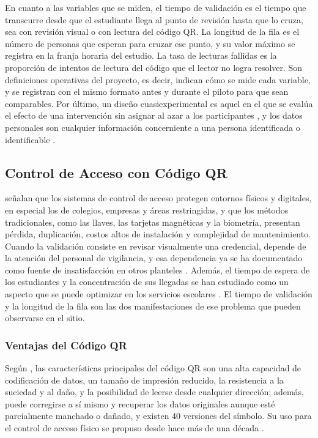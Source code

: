 En cuanto a las variables que se miden, el tiempo de validación es el tiempo
que transcurre desde que el estudiante llega al punto de revisión hasta que lo
cruza, sea con revisión visual o con lectura del código QR. La longitud de la
fila es el número de personas que esperan para cruzar ese punto, y su valor
máximo se registra en la franja horaria del estudio. La tasa de lecturas
fallidas es la proporción de intentos de lectura del código que el lector no
logra resolver. Son definiciones operativas del proyecto, es decir, indican
cómo se mide cada variable, y se registran con el mismo formato antes y
durante el piloto para que sean comparables. Por último, un diseño
cuasiexperimental es aquel en el que se evalúa el efecto de una intervención
sin asignar al azar a los participantes \parencite{campbellstanley1963}, y los
datos personales son cualquier información concerniente a una persona
identificada o identificable \parencite[art.~3, frac.~IX]{lgpdppso2025}.

\subsection{Control de Acceso con Código QR}
\textcite{alsawi2026qracs} señalan que los sistemas de control de acceso
protegen entornos físicos y digitales, en especial los de colegios, empresas y
áreas restringidas, y que los métodos tradicionales, como las llaves, las
tarjetas magnéticas y la biometría, presentan pérdida, duplicación, costos
altos de instalación y complejidad de mantenimiento. Cuando la validación
consiste en revisar visualmente una credencial, depende de la atención del
personal de vigilancia, y esa dependencia ya se ha documentado como fuente de
insatisfacción en otros planteles \parencite{torres2019qr}. Además, el tiempo
de espera de los estudiantes y la concentración de sus llegadas se han
estudiado como un aspecto que se puede optimizar en los servicios escolares
\parencite{talavera2025espera}. El tiempo de validación y la longitud de la
fila son las dos manifestaciones de ese problema que pueden observarse en el
sitio.

\subsubsection{Ventajas del Código QR}
Según \textcite{densowave2025qr}, las características principales del código
QR son una alta capacidad de codificación de datos, un tamaño de impresión
reducido, la resistencia a la suciedad y al daño, y la posibilidad de leerse
desde cualquier dirección; además, puede corregirse a sí mismo y recuperar los
datos originales aunque esté parcialmente manchado o dañado, y existen 40
versiones del símbolo. Su uso para el control de acceso físico se propuso
desde hace más de una década \parencite{kao2011physical}.

